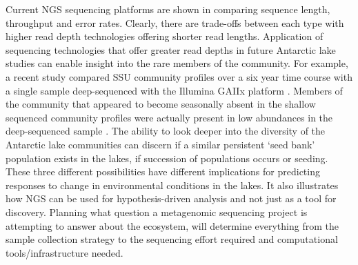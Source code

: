 Current \ac{NGS} sequencing platforms are shown in  comparing sequence length, throughput and error rates.
Clearly, there are trade-offs between each type with higher read depth technologies offering shorter read lengths. 
Application of sequencing technologies that offer greater read depths in future Antarctic lake studies can enable insight into the rare members of the community.
For example, a recent study compared \acs{SSU} community profiles over a six year time course with a single sample deep-sequenced with the Illumina GAIIx platform \cite{Caporaso2012}.
Members of the community that appeared to become seasonally absent in the shallow sequenced community profiles were actually present in low abundances in the deep-sequenced sample \cite{Caporaso2012}.
The ability to look deeper into the diversity of the Antarctic lake communities can discern if a similar persistent `seed bank' population exists in the lakes, if succession of populations occurs or seeding.
These three different possibilities have different implications for predicting responses to change in environmental conditions in the lakes.
It also illustrates how \ac{NGS} can be used for hypothesis-driven analysis and not just as a tool for discovery.
Planning what question a metagenomic sequencing project is attempting to answer about the ecosystem, will determine everything from the sample collection strategy to the sequencing effort required and computational tools/infrastructure needed.


